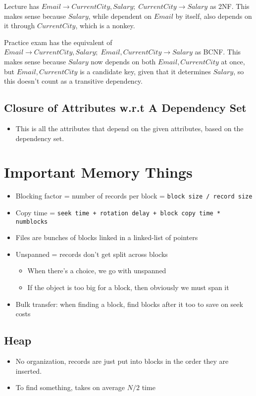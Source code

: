 \documentclass[11pt]{article}
\begin{document}
Lecture has \(Email \to CurrentCity, Salary;\; CurrentCity \to Salary\) as
2NF.
This makes sense because \(Salary\), while dependent on \(Email\) by itself,
also depends on it through \(CurrentCity\), which is a nonkey.


Practice exam has the equivalent of \(Email \to CurrentCity, Salary;\; Email,
    CurrentCity \to Salary\) as BCNF.
This makes sense because \(Salary\) now depends on both \(Email, CurrentCity\)
at once, but \(Email, CurrentCity\) is a candidate key, given that it
determines \(Salary\), so this doesn't count as a transitive dependency.




\subsection{Closure of Attributes w.r.t A Dependency Set}
\label{sec:orgea6c8ea}
\begin{itemize}
\item This is all the attributes that depend on the given attributes, based on
the dependency set.
\end{itemize}

\section{Important Memory Things}
\label{sec:orgdd05e16}
\begin{itemize}
\item Blocking factor = number of records per block = \texttt{block size / record size}
\item Copy time = \texttt{seek time + rotation delay + block copy time * numblocks}
\item Files are bunches of blocks linked in a linked-list of pointers
\item Unspanned = records don't get split across blocks
\begin{itemize}
\item When there's a choice, we go with unspanned
\item If the object is too big for a block, then obviously we must span it
\end{itemize}
\item Bulk transfer: when finding a block, find blocks after it too to save on
seek costs
\end{itemize}

\subsection{Heap}
\label{sec:orga93fc13}
\begin{itemize}
\item No organization, records are just put into blocks in the order they are
inserted.
\item To find something, takes on average \(N/2\) time
\end{itemize}
\end{document}
